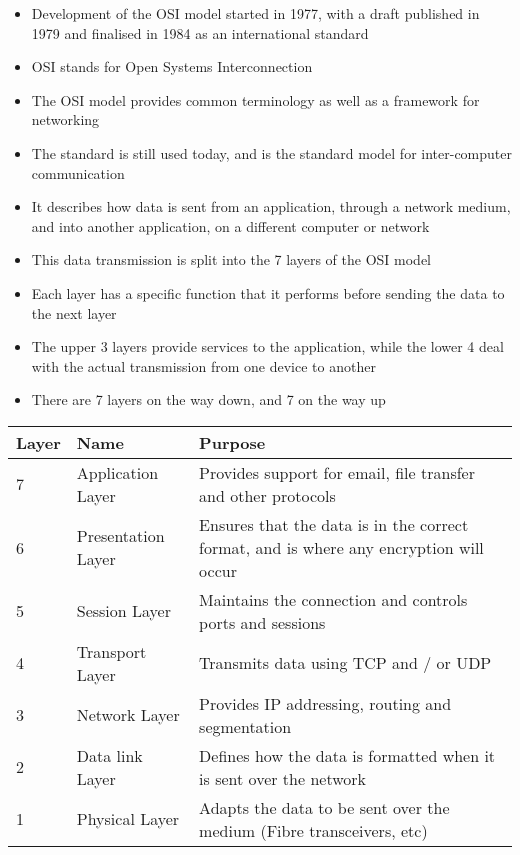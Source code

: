 
\begin{itemize}
  \item Development of the OSI model started in 1977, with a draft published in 1979 and finalised in 1984 as an international standard
  \item OSI stands for Open Systems Interconnection
  \item The OSI model provides common terminology as well as a framework for networking
  \item The standard is still used today, and is the standard model for inter-computer communication
  \item It describes how data is sent from an application, through a network medium, and into another application, on a different computer or network
  \item This data transmission is split into the 7 layers of the OSI model
  \item Each layer has a specific function that it performs before sending the data to the next layer
  \item The upper 3 layers provide services to the application, while the lower 4 deal with the actual transmission from one device to another
  \item There are 7 layers on the way down, and 7 on the way up
\end{itemize}

\begin{center}
  \begin{tabular}{ |p{}|p{}|p{}| }
    \hline
    Layer & Name & Purpose \\
    \hline
    7 & Application Layer & Provides support for email, file transfer and other protocols \\
    6 & Presentation Layer & Ensures that the data is in the correct format, and is where any encryption will occur \\
    5 & Session Layer & Maintains the connection and controls ports and sessions \\
    4 & Transport Layer & Transmits data using TCP and / or UDP \\
    3 & Network Layer & Provides IP addressing, routing and segmentation \\
    2 & Data link Layer & Defines how the data is formatted when it is sent over the network \\
    1 & Physical Layer & Adapts the data to be sent over the medium (Fibre transceivers, etc) \\
    \hline
  \end{tabular}
\end{center}
  
